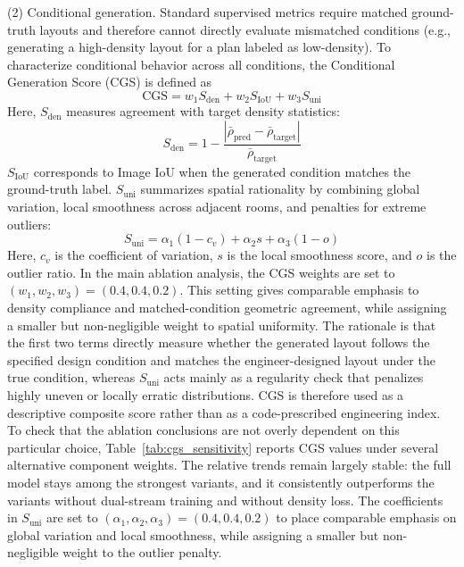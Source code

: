 (2) Conditional generation. Standard supervised metrics require matched ground-truth layouts and therefore cannot directly evaluate mismatched conditions (e.g., generating a high-density layout for a plan labeled as low-density). To characterize conditional behavior across all conditions, the Conditional Generation Score (CGS) is defined as
\begin{equation}
\text{CGS}=w_1 S_{\text{den}}+w_2 S_{\text{IoU}}+w_3 S_{\text{uni}}
\end{equation}
Here, $S_{\text{den}}$ measures agreement with target density statistics:
\begin{equation}
S_{\text{den}}=1-\frac{|\bar\rho_{\text{pred}}-\bar\rho_{\text{target}}|}{\bar\rho_{\text{target}}}
\end{equation}
$S_{\text{IoU}}$ corresponds to Image IoU when the generated condition matches the ground-truth label. $S_{\text{uni}}$ summarizes spatial rationality by combining global variation, local smoothness across adjacent rooms, and penalties for extreme outliers:
\begin{equation}
S_{\text{uni}}=\alpha_1(1-c_v)+\alpha_2 s+\alpha_3(1-o)
\end{equation}
Here, $c_v$ is the coefficient of variation, $s$ is the local smoothness score, and $o$ is the outlier ratio. In the main ablation analysis, the CGS weights are set to $(w_1,w_2,w_3)=(0.4,0.4,0.2)$. This setting gives comparable emphasis to density compliance and matched-condition geometric agreement, while assigning a smaller but non-negligible weight to spatial uniformity. The rationale is that the first two terms directly measure whether the generated layout follows the specified design condition and matches the engineer-designed layout under the true condition, whereas $S_{\text{uni}}$ acts mainly as a regularity check that penalizes highly uneven or locally erratic distributions. CGS is therefore used as a descriptive composite score rather than as a code-prescribed engineering index. To check that the ablation conclusions are not overly dependent on this particular choice, Table~\ref{tab:cgs_sensitivity} reports CGS values under several alternative component weights. The relative trends remain largely stable: the full model stays among the strongest variants, and it consistently outperforms the variants without dual-stream training and without density loss. The coefficients in $S_{\text{uni}}$ are set to $(\alpha_1,\alpha_2,\alpha_3)=(0.4,0.4,0.2)$ to place comparable emphasis on global variation and local smoothness, while assigning a smaller but non-negligible weight to the outlier penalty.


